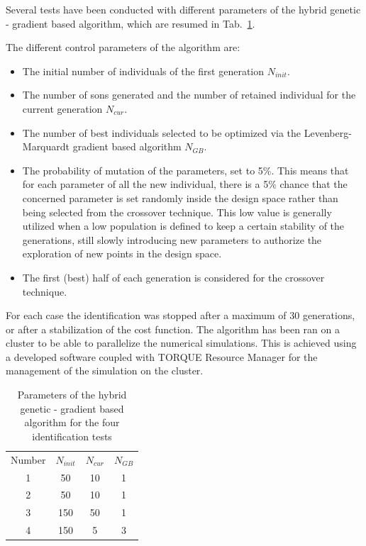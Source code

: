 Several tests have been conducted with different parameters of the hybrid genetic - gradient based algorithm, which are resumed in Tab.~\ref{tab:prefiden}. 

The different control parameters of the algorithm are:

\begin{itemize}
\item The initial number of individuals of the first generation $N_{init}$.
\item The number of sons generated and the number of retained individual for the current generation $N_{cur}$.
\item The number of best individuals selected to be optimized via the Levenberg-Marquardt gradient based algorithm $N_{GB}$.
\item The probability of mutation of the parameters, set to 5\%. This means that for each parameter of all the new individual, there is a 5\% chance that the concerned parameter is set randomly inside the design space rather than being selected from the crossover technique. This low value is generally utilized when a low population is defined to keep a certain stability of the generations, still slowly introducing new parameters to authorize the exploration of new points in the design space.
\item The first (best) half of each generation is considered for the crossover technique.
\end{itemize}

For each case the identification was stopped after a maximum of 30 generations, or after a stabilization of the cost function. The algorithm has been ran on a cluster to be able to parallelize the numerical simulations. This is achieved using a developed software coupled with TORQUE Resource Manager for the management of the simulation on the cluster. 

\begin{table}[ht]
\caption{Parameters of the hybrid genetic - gradient based algorithm for the four identification tests}
\begin{center}
\label{tab:prefiden}
\begin{tabular}{c c c c} %
\hline
Number & $N_{init}$ & $N_{cur}$ & $N_{GB}$ \\
1 & 50 & 10 & 1 \\
2 & 50 & 10 & 1 \\
3 & 150 & 50 & 1 \\
4 & 150 & 5 & 3 \\
\hline\end{tabular}
\end{center}
\end{table}

